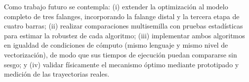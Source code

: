 \documentclass[conference]{IEEEtran}
\begin{document}
Como trabajo futuro se contempla: (i) extender la optimización al modelo completo de tres falanges, incorporando la falange distal y la tercera etapa de cuatro barras; (ii) realizar comparaciones multisemilla con pruebas estadísticas para estimar la robustez de cada algoritmo; (iii) implementar ambos algoritmos en igualdad de condiciones de cómputo (mismo lenguaje y mismo nivel de vectorización), de modo que sus tiempos de ejecución puedan compararse sin sesgo; y (iv) validar físicamente el mecanismo óptimo mediante prototipado y medición de las trayectorias reales.

\end{document}
